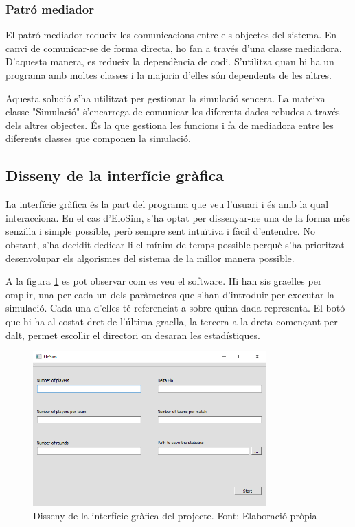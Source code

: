 \documentclass[a4paper]{article}
\begin{document}
\subsubsection*{Patró mediador}

El patró mediador redueix les comunicacions entre els objectes del sistema. En canvi de comunicar-se de forma directa, ho fan a través d'una classe mediadora. D'aquesta manera, es redueix la dependència de codi. S'utilitza quan hi ha un programa amb moltes classes i la majoria d'elles són dependents de les altres.

Aquesta solució s'ha utilitzat per gestionar la simulació sencera. La mateixa classe "Simulació" \. s'encarrega de comunicar les diferents dades rebudes a través dels altres objectes. És la que gestiona les funcions i fa de mediadora entre les diferents classes que componen la simulació.

\subsection{Disseny de la interfície gràfica}

La interfície gràfica és la part del programa que veu l'usuari i és amb la qual interacciona. En el cas d'EloSim, s'ha optat per dissenyar-ne una de la forma més senzilla i simple possible, però sempre sent intuïtiva i fàcil d'entendre. No obstant, s'ha decidit dedicar-li el mínim de temps possible perquè s'ha prioritzat desenvolupar els algorismes del sistema de la millor manera possible. 

A la figura \ref{fig:UiTFG} es pot observar com es veu el software. Hi han sis graelles per omplir, una per cada un dels paràmetres que s'han d'introduir per executar la simulació. Cada una d'elles té referenciat a sobre quina dada representa. El botó que hi ha al costat dret de l'última graella, la tercera a la dreta començant per dalt, permet escollir el directori on desaran les estadístiques.

\begin{figure} [H]
    \centering
    \includegraphics[width=0.8\textwidth]{images/UiTFG.png}
    \caption{Disseny de la interfície gràfica del projecte. Font: Elaboració pròpia}
    \label{fig:UiTFG}
\end{figure}
\end{document}
